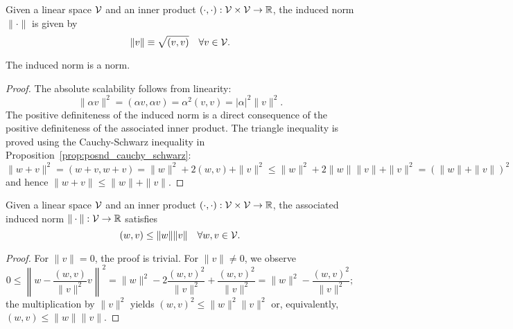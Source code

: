 \begin{definition}
  Given a linear space $\mathcal{V}$ and an inner product $(\cdot,\cdot): \mathcal{V} \times \mathcal{V} \to \mathbb{R}$, the induced norm $\| \cdot \|$ is given by
  \begin{equation*}
    \| v \| \equiv \sqrt{(v,v)} \quad \forall v \in \mathcal{V}.
  \end{equation*}
\end{definition}
\begin{remark}
  The induced norm is a norm.
  \begin{proof}
     The absolute scalability follows from linearity:
     \begin{equation*}
       \| \alpha v \|^2 = (\alpha v, \alpha v) = \alpha^2 (v,v) = |\alpha|^2 \| v \|^2.
     \end{equation*}
     The positive definiteness of the induced norm is a direct consequence of the positive definiteness of the associated inner product.  The triangle inequality is proved using the Cauchy-Schwarz inequality in Proposition~\ref{prop:posnd_cauchy_schwarz}:
     \begin{equation*}
       \| w + v \|^2
       = (w + v, w+ v)
       = \| w \|^2 + 2(w,v) + \| v \|^2
       \leq \| w \|^2 + 2 \| w \| \| v \| + \| v \|^2
       =  (\| w \| + \| v \|)^2
     \end{equation*}
     and hence $\| w + v \| \leq \| w \| + \| v \|$.
  \end{proof}
\end{remark}
\begin{proposition}
  \label{prop:posnd_cauchy_schwarz}
  Given a linear space $\mathcal{V}$ and an inner product $(\cdot, \cdot): \mathcal{V} \times \mathcal{V} \to \mathbb{R}$, the associated induced norm $\| \cdot \|: \mathcal{V} \to \mathbb{R}$ satisfies
  \begin{equation*}
    (w,v) \leq \| w \| \| v \| \quad \forall w ,v \in \mathcal{V}.
  \end{equation*}
  \begin{proof}
    For $\|v\|=0$, the proof is trivial.  For $\| v \| \neq 0$, we observe
    \begin{equation*}
      0 \leq \left\| w - \frac{(w,v)}{\| v \|^2} v \right\|^2
      = \| w \|^2 - 2 \frac{(w,v)^2}{\| v \|^2} + \frac{(w,v)^2}{\| v \|^2}
      = \| w \|^2 - \frac{(w,v)^2}{\| v \|^2};
    \end{equation*}
    the multiplication by $\| v \|^2$ yields $(w,v)^2 \leq \| w \|^2 \| v \|^2$ or, equivalently, $(w,v) \leq \| w \| \| v \|$.
  \end{proof}
\end{proposition}

